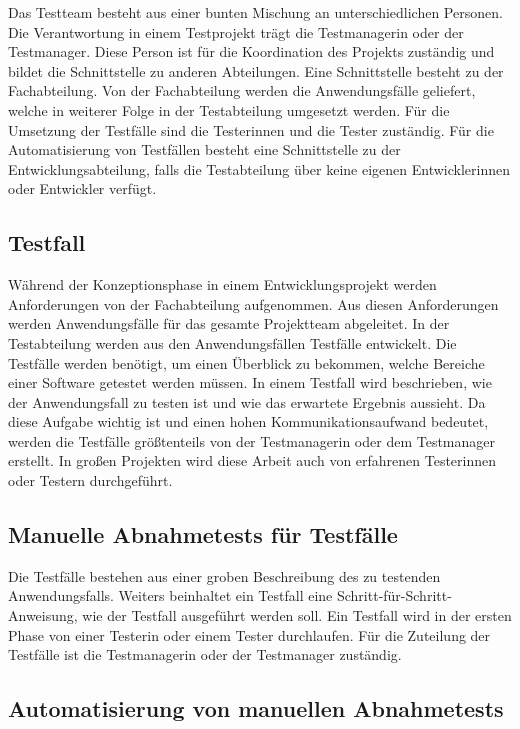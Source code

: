 Das Testteam besteht aus einer bunten Mischung an unterschiedlichen Personen. Die Verantwortung in einem Testprojekt trägt die Testmanagerin oder der Testmanager. Diese Person ist für die Koordination des Projekts zuständig und bildet die Schnittstelle zu anderen Abteilungen. Eine Schnittstelle besteht zu der Fachabteilung. Von der Fachabteilung werden die Anwendungsfälle geliefert, welche in weiterer Folge in der Testabteilung umgesetzt werden. Für die Umsetzung der Testfälle sind die Testerinnen und die Tester zuständig. Für die Automatisierung von Testfällen besteht eine Schnittstelle zu der Entwicklungsabteilung, falls die Testabteilung über keine eigenen Entwicklerinnen oder Entwickler verfügt.

\subsection{Testfall}

Während der Konzeptionsphase in einem Entwicklungsprojekt werden Anforderungen von der Fachabteilung aufgenommen. Aus diesen Anforderungen werden Anwendungsfälle für das gesamte Projektteam abgeleitet. In der Testabteilung werden aus den Anwendungsfällen Testfälle entwickelt. Die Testfälle werden benötigt, um einen Überblick zu bekommen, welche Bereiche einer Software getestet werden müssen. In einem Testfall wird beschrieben, wie der Anwendungsfall zu testen ist und wie das erwartete Ergebnis aussieht. Da diese Aufgabe wichtig ist und einen hohen Kommunikationsaufwand bedeutet, werden die Testfälle größtenteils von der Testmanagerin oder dem Testmanager erstellt. In großen Projekten wird diese Arbeit auch von erfahrenen Testerinnen oder Testern durchgeführt. 

\subsection{Manuelle Abnahmetests für Testfälle}

Die Testfälle bestehen aus einer groben Beschreibung des zu testenden Anwendungsfalls. Weiters beinhaltet ein Testfall eine Schritt-für-Schritt-Anweisung, wie der Testfall ausgeführt werden soll. Ein Testfall wird in der ersten Phase von einer Testerin oder einem Tester durchlaufen. Für die Zuteilung der Testfälle ist die Testmanagerin oder der Testmanager zuständig. 

\subsection{Automatisierung von manuellen Abnahmetests}

